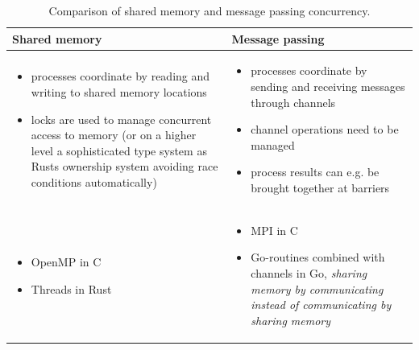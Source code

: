\begin{table}[!htb]
    \centering
    \begin{tabular}{|p{}|p{}|}
        \hline
        \textbf{Shared memory} & \textbf{Message passing} \\
        \hline
        \begin{itemize}
            \item processes coordinate by reading and writing 
            to shared memory locations
            \item locks are used to manage concurrent access
            to memory (or on a higher level a sophisticated
            type system as Rusts ownership system avoiding race
            conditions automatically)
        \end{itemize} & \begin{itemize}
            \item processes coordinate by sending and receiving messages through channels
            \item channel operations need to be managed
            \item process results can e.g. be brought together at barriers
        \end{itemize} \\
        \hline
        \begin{itemize}
            \item OpenMP in C
            \item Threads in Rust
        \end{itemize} & \begin{itemize}
            \item MPI in C
            \item Go-routines combined with channels in Go, \textit{sharing memory by communicating instead of communicating by sharing memory}
        \end{itemize} \\
        \hline
    \end{tabular}
    \caption{Comparison of shared memory and message passing concurrency.}
    \label{tab:shared_message}
\end{table}


